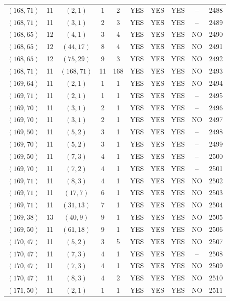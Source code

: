 \begin{longtable}{|c|c|c|c|c|c|c|c|c|c|}
$(168, 71)$ & 11 & $(2, 1)$ & 1 & 2 & YES & YES & YES & -- & 2488\\
$(168, 71)$ & 11 & $(3, 1)$ & 2 & 3 & YES & YES & YES & -- & 2489\\
$(168, 65)$ & 12 & $(4, 1)$ & 3 & 4 & YES & YES & YES & NO & 2490\\
$(168, 65)$ & 12 & $(44, 17)$ & 8 & 4 & YES & YES & YES & NO & 2491\\
$(168, 65)$ & 12 & $(75, 29)$ & 9 & 3 & YES & YES & YES & NO & 2492\\
$(168, 71)$ & 11 & $(168, 71)$ & 11 & 168 & YES & YES & YES & NO & 2493\\
$(169, 64)$ & 11 & $(2, 1)$ & 1 & 1 & YES & YES & YES & NO & 2494\\
$(169, 71)$ & 11 & $(2, 1)$ & 1 & 1 & YES & YES & YES & -- & 2495\\
$(169, 70)$ & 11 & $(3, 1)$ & 2 & 1 & YES & YES & YES & -- & 2496\\
$(169, 70)$ & 11 & $(3, 1)$ & 2 & 1 & YES & YES & YES & NO & 2497\\
$(169, 50)$ & 11 & $(5, 2)$ & 3 & 1 & YES & YES & YES & -- & 2498\\
$(169, 70)$ & 11 & $(5, 2)$ & 3 & 1 & YES & YES & YES & -- & 2499\\
$(169, 50)$ & 11 & $(7, 3)$ & 4 & 1 & YES & YES & YES & -- & 2500\\
$(169, 70)$ & 11 & $(7, 2)$ & 4 & 1 & YES & YES & YES & -- & 2501\\
$(169, 71)$ & 11 & $(8, 3)$ & 4 & 1 & YES & YES & YES & NO & 2502\\
$(169, 71)$ & 11 & $(17, 7)$ & 6 & 1 & YES & YES & YES & NO & 2503\\
$(169, 71)$ & 11 & $(31, 13)$ & 7 & 1 & YES & YES & YES & NO & 2504\\
$(169, 38)$ & 13 & $(40, 9)$ & 9 & 1 & YES & YES & YES & NO & 2505\\
$(169, 50)$ & 11 & $(61, 18)$ & 9 & 1 & YES & YES & YES & NO & 2506\\
$(170, 47)$ & 11 & $(5, 2)$ & 3 & 5 & YES & YES & YES & NO & 2507\\
$(170, 47)$ & 11 & $(7, 3)$ & 4 & 1 & YES & YES & YES & -- & 2508\\
$(170, 47)$ & 11 & $(7, 3)$ & 4 & 1 & YES & YES & YES & NO & 2509\\
$(170, 47)$ & 11 & $(8, 3)$ & 4 & 2 & YES & YES & YES & NO & 2510\\
$(171, 50)$ & 11 & $(2, 1)$ & 1 & 1 & YES & YES & YES & NO & 2511\\

\end{longtable}
